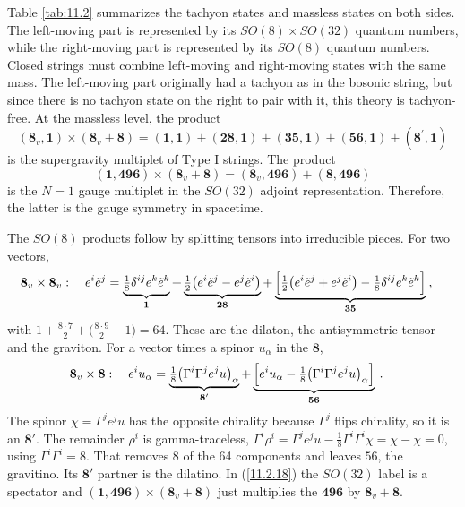 Table \ref{tab:11.2} summarizes the tachyon states and massless states on both sides. The left-moving part is represented by its $SO(8)\times SO(32)$ quantum numbers, while the right-moving part is represented by its $SO(8)$ quantum numbers. Closed strings must combine left-moving and right-moving states with the same mass. The left-moving part originally had a tachyon as in the bosonic string, but since there is no tachyon state on the right to pair with it, this theory is tachyon-free. At the massless level, the product
\begin{equation}
	(\mathbf{8}_{v},\mathbf{1})\times (\mathbf{8}_{v}+\mathbf{8}) =
	(\mathbf{1},\mathbf{1})+(\mathbf{28},\mathbf{1})+(\mathbf{35},\mathbf{1})+(\mathbf{56},\mathbf{1})+(\mathbf{8}^{\prime},\mathbf{1})\label{11.2.17}
\end{equation}
is the supergravity multiplet of Type I strings. The product
\begin{equation}
	(\mathbf{1},\mathbf{496})\times (\mathbf{8}_{v}+\mathbf{8}) = (\mathbf{8}_{v},\mathbf{496}) + (\mathbf{8},\mathbf{496})\label{11.2.18}
\end{equation}
is the $N=1$ gauge multiplet in the $SO(32)$ adjoint representation. Therefore, the latter is the gauge symmetry in spacetime.
\begin{tcolorbox}[breakable]
	\begin{remark}
		The $SO(8)$ products follow by splitting tensors into irreducible pieces. For two vectors,
		\begin{align*}
			\mathbf{8}_{v}\times\mathbf{8}_{v}:\quad e^{i}\tilde{e}^{j}
			&=\underbrace{\tfrac{1}{8}\delta^{ij}e^{k}\tilde{e}^{k}}_{\mathbf{1}}
			+\underbrace{\tfrac{1}{2}\bigl(e^{i}\tilde{e}^{j}-e^{j}\tilde{e}^{i}\bigr)}_{\mathbf{28}}
			+\underbrace{\Bigl[\tfrac{1}{2}\bigl(e^{i}\tilde{e}^{j}+e^{j}\tilde{e}^{i}\bigr)-\tfrac{1}{8}\delta^{ij}e^{k}\tilde{e}^{k}\Bigr]}_{\mathbf{35}}\:,
		\end{align*}
		with $1+\frac{8\cdot7}{2}+\bigl(\frac{8\cdot9}{2}-1\bigr)=64$. These are the dilaton, the antisymmetric tensor and the graviton. For a vector times a spinor $u_{\alpha}$ in the $\mathbf{8}$,
		\begin{align*}
			\mathbf{8}_{v}\times\mathbf{8}:\quad e^{i}u_{\alpha}
			&=\underbrace{\tfrac{1}{8}\bigl(\Gamma^{i}\Gamma^{j}e^{j}u\bigr)_{\alpha}}_{\mathbf{8}'}
			+\underbrace{\Bigl[e^{i}u_{\alpha}-\tfrac{1}{8}\bigl(\Gamma^{i}\Gamma^{j}e^{j}u\bigr)_{\alpha}\Bigr]}_{\mathbf{56}}\:.
		\end{align*}
		The spinor $\chi=\Gamma^{j}e^{j}u$ has the opposite chirality because $\Gamma^{j}$ flips chirality, so it is an $\mathbf{8}'$. The remainder $\rho^{i}$ is gamma-traceless, $\Gamma^{i}\rho^{i}=\Gamma^{j}e^{j}u-\frac{1}{8}\Gamma^{i}\Gamma^{i}\chi=\chi-\chi=0$, using $\Gamma^{i}\Gamma^{i}=8$. That removes 8 of the 64 components and leaves $56$, the gravitino. Its $\mathbf{8}'$ partner is the dilatino. In (\ref{11.2.18}) the $SO(32)$ label is a spectator and $(\mathbf{1},\mathbf{496})\times(\mathbf{8}_{v}+\mathbf{8})$ just multiplies the $\mathbf{496}$ by $\mathbf{8}_{v}+\mathbf{8}$.
	\end{remark}
\end{tcolorbox}

